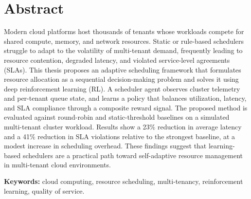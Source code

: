 \chapter*{Abstract}
\thispagestyle{empty}

Modern cloud platforms host thousands of tenants whose workloads compete for
shared compute, memory, and network resources. Static or rule-based
schedulers struggle to adapt to the volatility of multi-tenant demand,
frequently leading to resource contention, degraded latency, and violated
service-level agreements (SLAs). This thesis proposes an adaptive scheduling
framework that formulates resource allocation as a sequential
decision-making problem and solves it using deep reinforcement learning
(RL). A scheduler agent observes cluster telemetry and per-tenant queue
state, and learns a policy that balances utilization, latency, and SLA
compliance through a composite reward signal. The proposed method is
evaluated against round-robin and static-threshold baselines on a simulated
multi-tenant cluster workload. Results show a 23\% reduction in average
latency and a 41\% reduction in SLA violations relative to the strongest
baseline, at a modest increase in scheduling overhead. These findings
suggest that learning-based schedulers are a practical path toward
self-adaptive resource management in multi-tenant cloud environments.

\vspace{10pt}
\noindent\textbf{Keywords:} cloud computing, resource scheduling,
multi-tenancy, reinforcement learning, quality of service.

